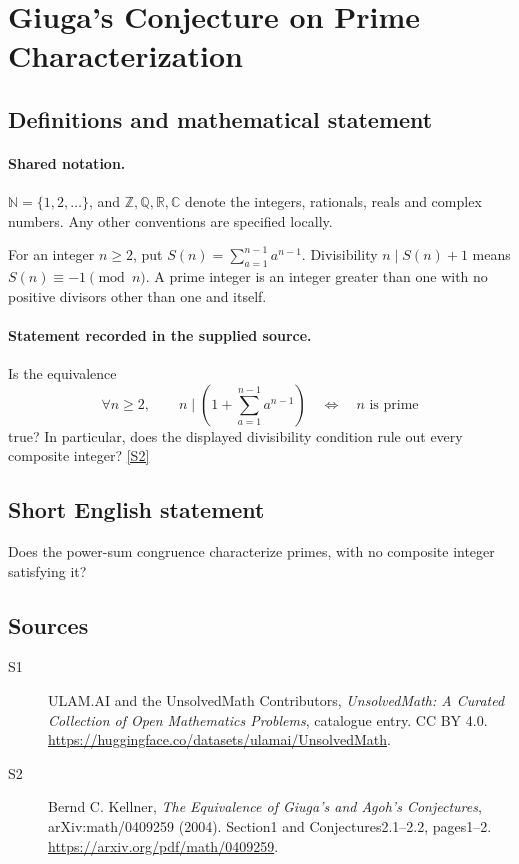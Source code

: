 \documentclass[11pt]{book}
\newcommand{\sref}[2]{\hyperlink{source:#1:#2}{[S#2]}}
\begin{document}
\section{Giuga's Conjecture on Prime Characterization}\label{statement}

\subsection{Definitions and mathematical statement}

\paragraph{Shared notation.}$\mathbb N=\{1,2,\ldots\}$, and $\mathbb Z,\mathbb Q,\mathbb R,\mathbb C$ denote the integers, rationals, reals and complex numbers. Any other conventions are specified locally.


For an integer $n\geq2$, put $S(n)=\sum_{a=1}^{n-1}a^{n-1}$. Divisibility $n\mid S(n)+1$ means $S(n)\equiv-1\pmod n$. A prime integer is an integer greater than one with no positive divisors other than one and itself.
\paragraph{Statement recorded in the supplied source.}
Is the equivalence
\[\forall n\geq2,\qquad n\mid\left(1+\sum_{a=1}^{n-1}a^{n-1}\right)\quad\Longleftrightarrow\quad n\text{ is prime}\]
true? In particular, does the displayed divisibility condition rule out every composite integer? \sref{statement}{2}
\subsection{Short English statement}
Does the power-sum congruence characterize primes, with no composite integer satisfying it?
\subsection{Sources}
\begin{description}
\item[\hypertarget{source:statement:1}{S1}] ULAM.AI and the UnsolvedMath Contributors, \emph{UnsolvedMath: A Curated Collection of Open Mathematics Problems}, catalogue entry. CC BY 4.0. \url{https://huggingface.co/datasets/ulamai/UnsolvedMath}.
\item[\hypertarget{source:statement:2}{S2}] Bernd C. Kellner, \emph{The Equivalence of Giuga’s and Agoh’s Conjectures}, arXiv:math/0409259 (2004). Section1 and Conjectures2.1--2.2, pages1--2. \url{https://arxiv.org/pdf/math/0409259}.
\end{description}
\label{end:statement}
\end{document}
